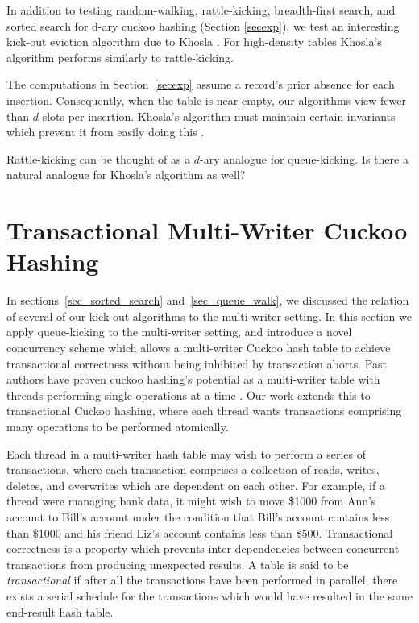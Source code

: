 \documentclass{sig-alternate-05-2015}
\begin{document}
In addition to testing random-walking, rattle-kicking, breadth-first
search, and sorted search for d-ary cuckoo hashing (Section
\ref{secexp}), we test an interesting kick-out eviction algorithm due
to Khosla \cite{khosla13}. For high-density tables Khosla's algorithm
performs similarly to rattle-kicking.

The computations in Section~\ref{secexp} assume a record's prior
absence for each insertion. Consequently, when the table is near
empty, our algorithms view fewer than $d$ slots per
insertion. Khosla's algorithm must maintain certain
invariants which prevent it from easily doing this  \cite{khosla13}.

Rattle-kicking can be thought of as a $d$-ary analogue for
queue-kicking. Is there a natural analogue for Khosla's algorithm as well?




\section{Transactional Multi-Writer Cuckoo Hashing}\label{secconcurrent} 

In sections~\ref{sec_sorted_search} and~\ref{sec_queue_walk}, we
discussed the relation of several of our kick-out algorithms to the
multi-writer setting. In this section we apply queue-kicking to the
multi-writer setting, and introduce a novel concurrency scheme which
allows a multi-writer Cuckoo hash table to achieve transactional
correctness without being inhibited by transaction aborts. Past
authors have proven cuckoo hashing's potential as a multi-writer table
with threads performing single operations at a time \cite{fan13,
  li14}. Our work extends this to transactional Cuckoo hashing, where
each thread wants transactions comprising many operations to be
performed atomically.

Each thread in a multi-writer hash table may wish to perform a series
of transactions, where each transaction comprises a collection of
reads, writes, deletes, and overwrites which are dependent on each
other. For example, if a thread were managing bank data, it might wish
to move \$1000 from Ann's account to Bill's account under the
condition that Bill's account contains less than \$1000 and his friend
Liz's account contains less than \$500. Transactional correctness is a
property which prevents inter-dependencies between concurrent
transactions from producing unexpected results. A table is said to be
\emph{transactional} if after all the transactions have been performed
in parallel, there exists a serial schedule for the transactions which
would have resulted in the same end-result hash table.
\end{document}
